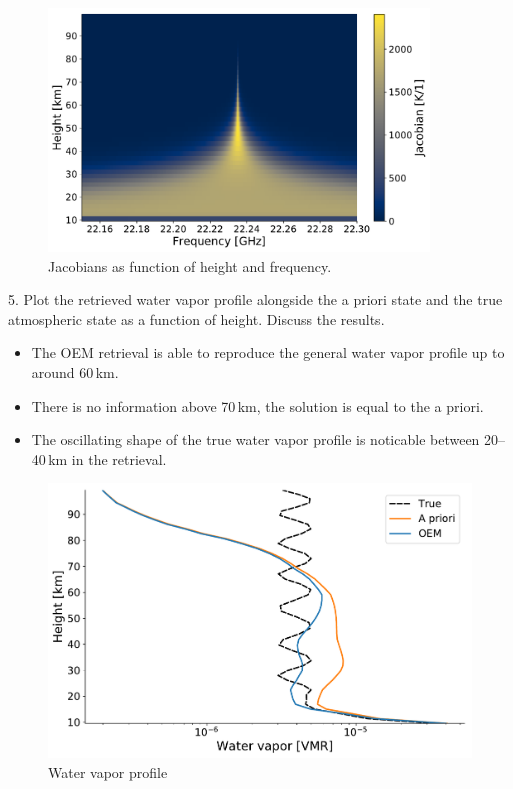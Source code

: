 \documentclass[paper=a4, fontsize=11pt]{scrartcl}
\begin{document}
\begin{figure}[h!]
  \centering
  \includegraphics[width=0.9\textwidth]{plots/jacobians2d.pdf}
  \caption{Jacobians as function of height and frequency.
    \label{fig:jacobians2d}}
\end{figure}

\clearpage

5. Plot the retrieved water vapor profile alongside the a priori state and the
true atmospheric state as a function of height. Discuss the results.
\begin{itemize}
  \item The OEM retrieval is able to reproduce the general water vapor profile
    up to around 60\,km.
  \item There is no information above 70\,km, the solution is equal to the a
    priori.
  \item The oscillating shape of the true water vapor profile is noticable
    between 20--40\,km in the retrieval.
\end{itemize}

\begin{figure}[ht]
  \centering
  \includegraphics[width=\textwidth]{plots/water_vapor_profile.pdf}
  \caption{Water vapor profile \label{fig:wv_profile}}
\end{figure}
\end{document}
